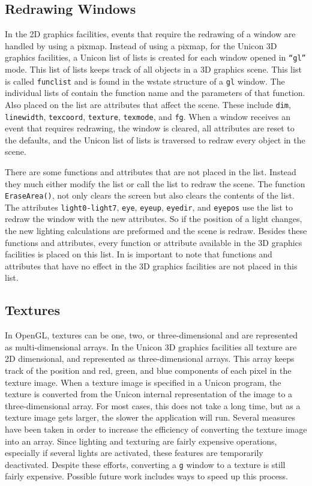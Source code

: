 \subsection{Redrawing Windows}

In the 2D graphics facilities, events that require the redrawing of a
window are handled by using a pixmap. Instead of using a pixmap, for
the Unicon 3D graphics facilities, a Unicon list of lists is created
for each window opened in \texttt{{}``gl''} mode. This list of lists
keeps track of all objects in a 3D graphics scene. This list is called
\texttt{funclist} and is found in the wstate structure of a
\texttt{{\textquotedbl}gl{\textquotedbl}} window. The individual lists
of contain the function name and the parameters of that function. Also
placed on the list are attributes that affect the scene. These include
\texttt{dim}, \texttt{linewidth}, \texttt{texcoord}, \texttt{texture},
\texttt{texmode}, and \texttt{fg}. When a window receives an event
that requires redrawing, the window is cleared, all attributes are
reset to the defaults, and the Unicon list of lists is traversed to
redraw every object in the scene.

There are some functions and attributes that are not placed in the
list. Instead they much either modify the list or call the list to
redraw the scene. The function \texttt{EraseArea()}, not only clears
the screen but also clears the contents of the list. The attributes
\texttt{light0-light7}, \texttt{eye}, \texttt{eyeup}, \texttt{eyedir},
and \texttt{eyepos} use the list to redraw the window with the new
attributes. So if the position of a light changes, the new lighting
calculations are preformed and the scene is redraw. Besides these
functions and attributes, every function or attribute available in the
3D graphics facilities is placed on this list. In is important to note
that functions and attributes that have no effect in the 3D graphics
facilities are not placed in this list.

\subsection{Textures}

In OpenGL, textures can be one, two, or three-dimensional and are
represented as multi-dimensional arrays. In the Unicon 3D graphics
facilities all texture are 2D dimensional, and represented as
three-dimensional arrays. This array keeps track of the position and
red, green, and blue components of each pixel in the texture
image. When a texture image is specified in a Unicon program, the
texture is converted from the Unicon internal representation of the
image to a three-dimensional array. For most cases, this does not take
a long time, but as a texture image gets larger, the slower the
application will run. Several measures have been taken in order to
increase the efficiency of converting the texture image into an
array. Since lighting and texturing are fairly expensive operations,
especially if several lights are activated, these features are
temporarily deactivated. Despite these efforts, converting a
{\textquotedbl}\texttt{g{\textquotedbl}} window to a texture is still
fairly expensive. Possible future work includes ways to speed up this
process.

